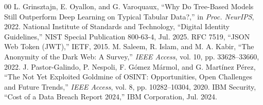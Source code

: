 \documentclass[conference]{IEEEtran}
\begin{document}
\begin{thebibliography}{00}
 L. Grinsztajn, E. Oyallon, and G. Varoquaux, ``Why Do Tree-Based Models Still Outperform Deep Learning on Typical Tabular Data?,'' in \textit{Proc. NeurIPS}, 2022.
 National Institute of Standards and Technology, ``Digital Identity Guidelines,'' NIST Special Publication 800-63-4, Jul. 2025.
 RFC 7519, ``JSON Web Token (JWT),'' IETF, 2015.
 M. Saleem, R. Islam, and M. A. Kabir, ``The Anonymity of the Dark Web: A Survey,'' \textit{IEEE Access}, vol. 10, pp. 33628--33660, 2022.
 J. Pastor-Galindo, P. Nespoli, F. G{\'o}mez M{\'a}rmol, and G. Mart{\'i}nez P{\'e}rez, ``The Not Yet Exploited Goldmine of OSINT: Opportunities, Open Challenges and Future Trends,'' \textit{IEEE Access}, vol. 8, pp. 10282--10304, 2020.
 IBM Security, ``Cost of a Data Breach Report 2024,'' IBM Corporation, Jul. 2024.
\end{thebibliography}
\end{document}
